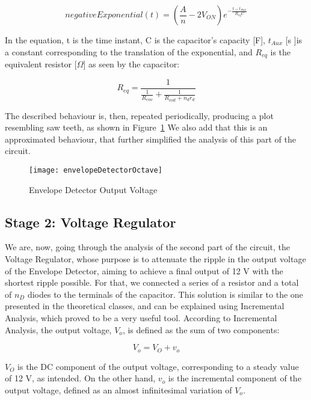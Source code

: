 \begin{equation}
	negativeExponential(t) = (\frac{A}{n} - 2V_{ON})e^{-\frac{t - t_{Aux}}{R_{eq}C}}
	\label{eq:Exponential}
\end{equation}

In the equation, t is the time instant, C is the capacitor's capacity [F], $t_{Aux}$ [s ]is a constant corresponding to the translation of the exponential, and $R_{eq}$ is the equivalent resistor [$\Omega$] as seen by the capacitor:

\begin{equation}
	R_{eq} = \frac{1}{\frac{1}{R_{env}} + \frac{1}{R_{volt} + n_d r_d}}
	\label{eq:R_eq}
\end{equation}

The described behaviour is, then, repeated periodically, producing a plot resembling saw teeth, as shown in Figure~\ref{fig:vEnv} We also add that this is an approximated behaviour, that further simplified the analysis of this part of the circuit.  

\FloatBarrier
\begin{figure}[h] \centering
	\texttt{[image: envelopeDetectorOctave]}
	\caption{Envelope Detector Output Voltage}
	\label{fig:vEnv}
\end{figure}
\FloatBarrier

\subsection{Stage 2: Voltage Regulator}

We are, now, going through the analysis of the second part of the circuit, the Voltage Regulator, whose purpose is to attenuate the ripple in the output voltage of the Envelope Detector, aiming to achieve a final output of 12 V with the shortest ripple possible. For that, we connected a series of a resistor and a total of $n_D$ diodes to the terminals of the capacitor. This solution is similar to the one presented in the theoretical classes, and can be explained using Incremental Analysis, which proved to be a very useful tool.
According to Incremental Analysis, the output voltage, $V_o$, is defined as the sum of two components:

\begin{equation}
	V_o = V_O + v_o
	\label{eq:vOutput}
\end{equation}

$V_O$ is the DC component of the output voltage, corresponding to a steady value of 12 V, as intended. On the other hand, $v_o$ is the incremental component of the output voltage, defined as an almost infinitesimal variation of $V_o$.

